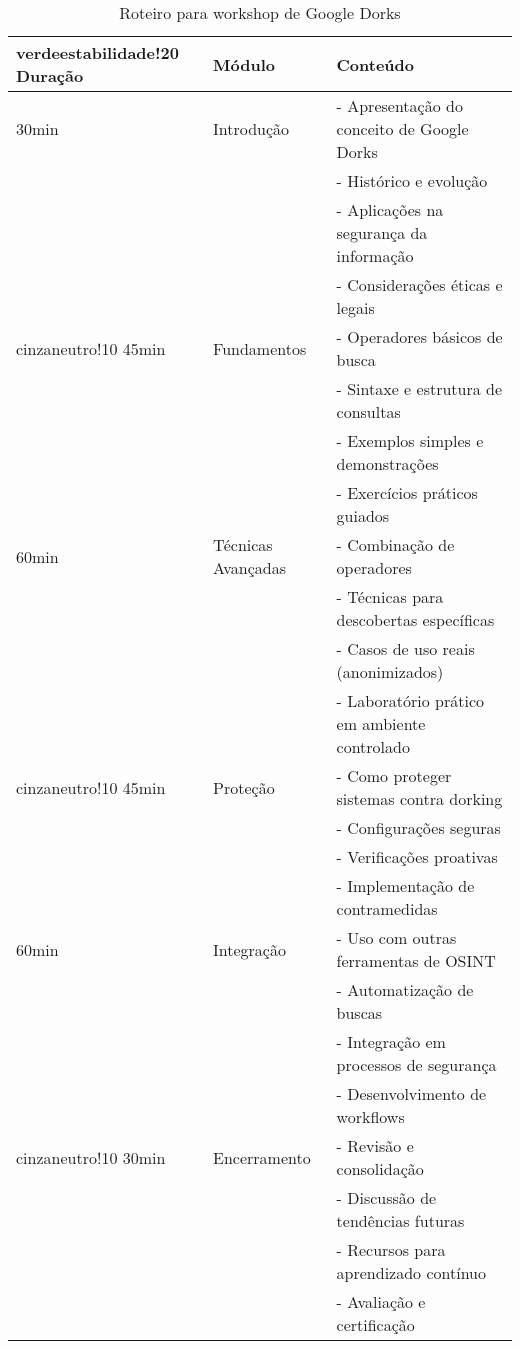 \documentclass[12pt,a4paper]{book}
\begin{document}
\begin{table}[h]
\centering
\begin{tabular}{|p{2cm}|p{4cm}|p{9cm}|}
\hline
{verdeestabilidade!20} \textbf{Duração} & \textbf{Módulo} & \textbf{Conteúdo} \\
\hline
30min & Introdução & - Apresentação do conceito de Google Dorks \\
& & - Histórico e evolução \\
& & - Aplicações na segurança da informação \\
& & - Considerações éticas e legais \\
\hline
{cinzaneutro!10} 45min & Fundamentos & - Operadores básicos de busca \\
& & - Sintaxe e estrutura de consultas \\
& & - Exemplos simples e demonstrações \\
& & - Exercícios práticos guiados \\
\hline
60min & Técnicas Avançadas & - Combinação de operadores \\
& & - Técnicas para descobertas específicas \\
& & - Casos de uso reais (anonimizados) \\
& & - Laboratório prático em ambiente controlado \\
\hline
{cinzaneutro!10} 45min & Proteção & - Como proteger sistemas contra dorking \\
& & - Configurações seguras \\
& & - Verificações proativas \\
& & - Implementação de contramedidas \\
\hline
60min & Integração & - Uso com outras ferramentas de OSINT \\
& & - Automatização de buscas \\
& & - Integração em processos de segurança \\
& & - Desenvolvimento de workflows \\
\hline
{cinzaneutro!10} 30min & Encerramento & - Revisão e consolidação \\
& & - Discussão de tendências futuras \\
& & - Recursos para aprendizado contínuo \\
& & - Avaliação e certificação \\
\hline
\end{tabular}
\caption{Roteiro para workshop de Google Dorks}
\end{table}
\end{document}
